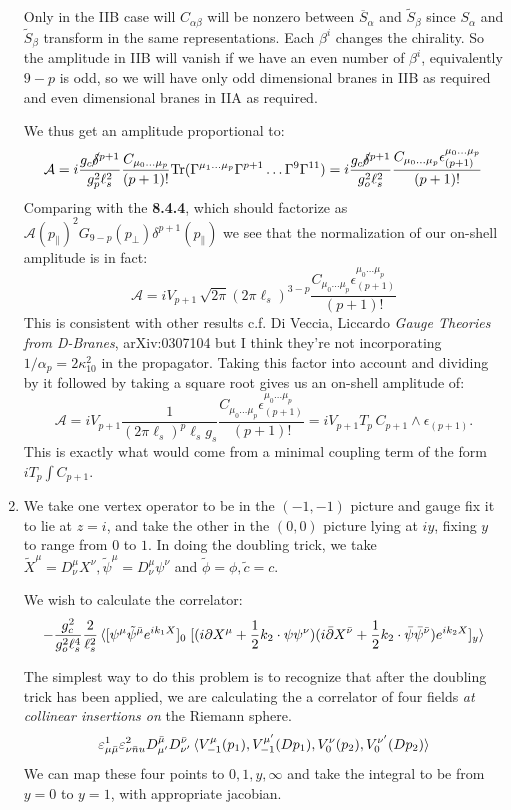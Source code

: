 \documentclass[11pt, class=article, crop=false]{standalone}
\begin{document}
\begin{enumerate}
	Only in the IIB case will $C_{\alpha \beta}$ will be nonzero between $\overline{S}_\alpha$ and $\tilde S_\beta$ since $S_\alpha$ and $\tilde S_\beta$ transform in the same representations. Each $\beta^i$ changes the chirality. So the amplitude in IIB will vanish if we have an even number of $\beta^i$, equivalently $9-p$ is odd, so we will have only odd dimensional branes in IIB as required and even dimensional branes in IIA as required. 
	
	We thus get an amplitude proportional to:
	\[
		\mathcal A = i \frac{g_c \cancel\delta^{p+1}}{g_p^2 \ell_s^2} \frac{C_{\mu_0 \dots \mu_p}}{(p+1)!} \mathrm{Tr}(\Gamma^{\mu_1 \dots \mu_p} \Gamma^{p+1} \dots \Gamma^9 \Gamma^{11}) = i \frac{g_c \cancel\delta^{p+1}}{g_o^2 \ell_s^2} \frac{C_{\mu_0 \dots \mu_p} \epsilon_{(p+1)}^{\mu_0 \dots \mu_p}}{(p+1)!} 
	\]
	Comparing with the \textbf{8.4.4}, which should factorize as $\mathcal A(p_\parallel)^2 G_{9-p}(p_\perp) \delta^{p+1}(p_\parallel)$ we see that the normalization of our on-shell amplitude is in fact:
	\[
		\mathcal A = i V_{p+1} \, \sqrt{2 \pi} (2\pi \ell_s)^{3-p} \frac{C_{\mu_0 \dots \mu_p} \epsilon_{(p+1)}^{\mu_0 \dots \mu_p}}{(p+1)!} 
	\]
	This is consistent with other results c.f. Di Veccia, Liccardo \emph{Gauge Theories from D-Branes}, arXiv:0307104 but I think they're not incorporating $1/\alpha_p = 2 \kappa_{10}^2$ in the propagator. Taking this factor into account and dividing by it followed by taking a square root gives us an on-shell amplitude of:
	\[
		\mathcal A = i V_{p+1} \frac{1}{(2 \pi \ell_s)^p \ell_s g_s} \frac{C_{\mu_0 \dots \mu_p} \epsilon_{(p+1)}^{\mu_0 \dots \mu_p}}{(p+1)!}  = i V_{p+1} T_p \, C_{p+1} \wedge \epsilon_{(p+1)}.
	\]
	This is exactly what would come from a minimal coupling term of the form $i T_p \int C_{p+1}$.
	
	\item We take one vertex operator to be in the $(-1, -1)$ picture and gauge fix it to lie at $z=i$, and take the other in the $(0, 0)$ picture lying at $iy$, fixing $y$ to range from $0$ to $1$. In doing the doubling trick, we take $\tilde X^\mu = D^\mu_\nu X^\nu, \tilde \psi^\mu = D^\mu_\nu \psi^\nu$ and $\tilde \phi = \phi, \tilde c = c$. 
	
	We wish to calculate the correlator:
	\[
		-\frac{g_c^2}{g_o^2 \ell_s^4} \frac{2}{\ell_s^2} \braket{[\psi^\mu \tilde \psi^{\bar \mu} e^{i k_1 X}]_0\; [(i \partial X^\mu + \frac12 k_2 \cdot \psi \psi^\nu) (i \bar {\partial} X^{\bar \nu} + \frac12 k_2 \cdot \bar \psi \bar \psi^{\bar \nu}) e^{i k_2 X}]_y }
	\]
	
	The simplest way to do this problem is to recognize that after the doubling trick has been applied, we are calculating the a correlator of four fields \emph{at collinear insertions on} the Riemann sphere. 
	\[
		\varepsilon^1_{\mu \bar \mu} \varepsilon^2_{\nu \bar nu} D^{\bar \mu}_{\mu'} D^{\bar \nu}_{\nu'} \braket{V_{-1}^\mu(p_1), V_{-1}^{\mu'}(D p_1), V_0^\nu(p_2), V_0^{\nu'}(D p_2)}
	\]
	 We can map these four points to $0,1,y, \infty$ and take the integral to be from $y = 0$ to $y = 1$, with appropriate jacobian. 
	 

\end{enumerate}
\end{document}
